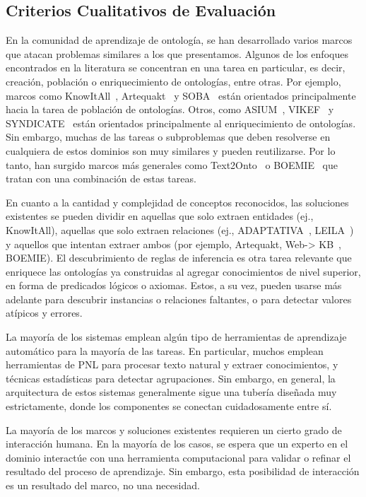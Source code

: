 \subsection{Criterios Cualitativos de Evaluación}

En la comunidad de aprendizaje de ontología, se han desarrollado varios marcos que atacan problemas similares a los que presentamos.
Algunos de los enfoques encontrados en la literatura se concentran en una tarea en particular, es decir, creación, población o enriquecimiento de ontologías, entre otras.
Por ejemplo, marcos como KnowItAll~\cite{knowitall}, Artequakt~\cite{artequakt} y SOBA~\cite{soba} están orientados principalmente hacia la tarea de población de ontologías.
Otros, como ASIUM~\cite{asium}, VIKEF~\cite{vikef} y SYNDICATE~\cite{syndikate} están orientados principalmente al enriquecimiento de ontologías.
Sin embargo, muchas de las tareas o subproblemas que deben resolverse en cualquiera de estos dominios son muy similares y pueden reutilizarse.
Por lo tanto, han surgido marcos más generales como Text2Onto~\cite{cimiano2005text2onto} o BOEMIE~\cite{boemie} que tratan con una combinación de estas tareas.

En cuanto a la cantidad y complejidad de conceptos reconocidos, las soluciones existentes se pueden dividir en aquellas que solo extraen entidades (ej., KnowItAll), aquellas que solo extraen relaciones (ej., ADAPTATIVA~\cite{adaptativa}, LEILA~\cite{leila}) y aquellos que intentan extraer ambos (por ejemplo, Artequakt, Web-> KB~\cite{webkb}, BOEMIE).
El descubrimiento de reglas de inferencia es otra tarea relevante que enriquece las ontologías ya construidas al agregar conocimientos de nivel superior, en forma de predicados lógicos o axiomas.
Estos, a su vez, pueden usarse más adelante para descubrir instancias o relaciones faltantes, o para detectar valores atípicos y errores.

La mayoría de los sistemas emplean algún tipo de herramientas de aprendizaje automático para la mayoría de las tareas. En particular, muchos emplean herramientas de PNL para procesar texto natural y extraer conocimientos, y técnicas estadísticas para detectar agrupaciones.
Sin embargo, en general, la arquitectura de estos sistemas generalmente sigue una tubería diseñada muy estrictamente, donde los componentes se conectan cuidadosamente entre sí.

La mayoría de los marcos y soluciones existentes requieren un cierto grado de interacción humana. En la mayoría de los casos, se espera que un experto en el dominio interactúe con una herramienta computacional para validar o refinar el resultado del proceso de aprendizaje.
Sin embargo, esta posibilidad de interacción es un resultado del marco, no una necesidad.

